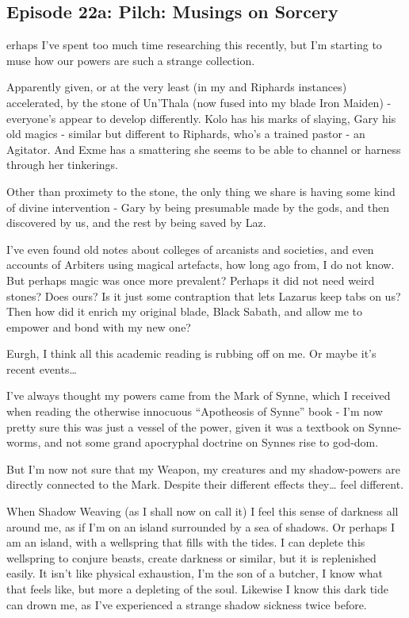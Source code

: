 \subsection{Episode 22a: Pilch: Musings on Sorcery}

erhaps I’ve spent too much time researching this recently, but I’m starting to muse how our powers are such a strange collection.\medskip

Apparently given, or at the very least (in my and Riphards instances) accelerated, by the stone of Un’Thala (now fused into my blade Iron Maiden) - everyone’s appear to develop differently. Kolo has his marks of slaying, Gary his old magics - similar but different to Riphards, who’s a trained pastor - an Agitator. And Exme has a smattering she seems to be able to channel or harness through her tinkerings.\medskip

Other than proximety to the stone, the only thing we share is having some kind of divine intervention - Gary by being presumable made by the gods, and then discovered by us, and the rest by being saved by Laz.\medskip

I’ve even found old notes about colleges of arcanists and societies, and even accounts of Arbiters using magical artefacts, how long ago from, I do not know. But perhaps magic was once more prevalent? Perhaps it did not need weird stones? Does ours? Is it just some contraption that lets Lazarus keep tabs on us? Then how did it enrich my original blade, Black Sabath, and allow me to empower and bond with my new one?\medskip

Eurgh, I think all this academic reading is rubbing off on me. Or maybe it’s recent events…\medskip

I’ve always thought my powers came from the Mark of Synne, which I received when reading the otherwise innocuous “Apotheosis of Synne” book - I’m now pretty sure this was just a vessel of the power, given it was a textbook on Synne-worms, and not some grand apocryphal doctrine on Synnes rise to god-dom.\medskip

But I’m now not sure that my Weapon, my creatures and my shadow-powers are directly connected to the Mark. Despite their different effects they… feel different.\medskip

When Shadow Weaving (as I shall now on call it) I feel this sense of darkness all around me, as if I’m on an island surrounded by a sea of shadows. Or perhaps I am an island, with a wellspring that fills with the tides. I can deplete this wellspring to conjure beasts, create darkness or similar, but it is replenished easily. It isn’t like physical exhaustion, I’m the son of a butcher, I know what that feels like, but more a depleting of the soul. Likewise I know this dark tide can drown me, as I’ve experienced a strange shadow sickness twice before.\medskip


